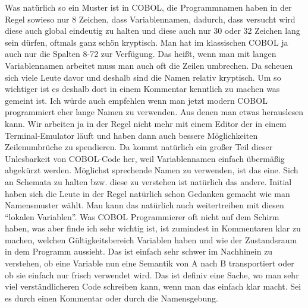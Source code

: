 {Was natürlich so ein Muster ist in COBOL, die Programmnamen haben in der Regel sowieso nur 8 Zeichen, dass Variablennamen, dadurch, dass versucht wird diese auch global eindeutig zu halten und diese auch nur 30 oder 32 Zeichen lang sein dürfen, oftmals ganz schön kryptisch. Man hat im klassischen COBOL ja auch nur die Spalten 8-72 zur Verfügung. Das heißt, wenn man mit langen Variablennamen arbeitet muss man auch oft die Zeilen umbrechen. Da scheuen sich viele Leute davor und deshalb sind die Namen relativ kryptisch. Um so wichtiger ist es deshalb dort in einem Kommentar kenntlich zu machen was gemeint ist. Ich würde auch empfehlen wenn man jetzt modern COBOL programmiert eher lange Namen zu verwenden. Aus denen man etwas herauslesen kann. Wir arbeiten ja in der Regel nicht mehr mit einem Editor der in einem Terminal-Emulator läuft und haben dann auch bessere Möglichkeiten Zeilenumbrüche zu spendieren. Da kommt natürlich ein großer Teil dieser Unlesbarkeit von COBOL-Code her, weil Variablennamen einfach übermäßig abgekürzt werden. Möglichst sprechende Namen zu verwenden, ist das eine. Sich an Schemata zu halten bzw. diese zu verstehen ist natürlich das andere. Initial haben sich die Leute in der Regel natürlich schon Gedanken gemacht wie man Namensmuster wählt. Man kann das natürlich auch weitertreiben mit diesen ``lokalen Variablen''. Was COBOL Programmierer oft nicht auf dem Schirm haben, was aber finde ich sehr wichtig ist, ist zumindest in Kommentaren klar zu machen, welchen Gültigkeitsbereich Variablen haben und wie der Zustandsraum in dem Programm aussieht. Das ist einfach sehr schwer im Nachhinein zu verstehen, ob eine Variable nun eine Semantik von A nach B transportiert oder ob sie einfach nur frisch verwendet wird. Das ist definiv eine Sache, wo man sehr viel verständlicheren Code schreiben kann, wenn man das einfach klar macht. Sei es durch einen Kommentar oder durch die Namensgebung.
\medskip

}
